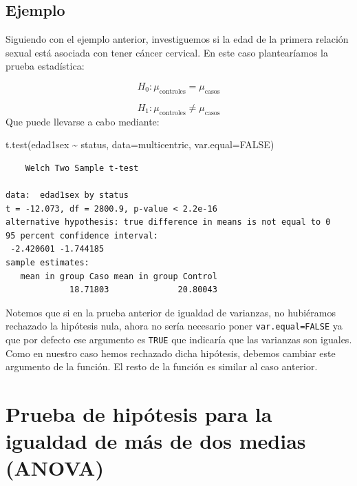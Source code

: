\documentclass[
]{book}
\newenvironment{Shaded}{\begin{snugshade}}{\end{snugshade}}
\newcommand{\AttributeTok}[1]{\textcolor[rgb]{0.77,0.63,0.00}{#1}}
\newcommand{\ConstantTok}[1]{\textcolor[rgb]{0.00,0.00,0.00}{#1}}
\newcommand{\FunctionTok}[1]{\textcolor[rgb]{0.00,0.00,0.00}{#1}}
\newcommand{\NormalTok}[1]{#1}
\newcommand{\SpecialCharTok}[1]{\textcolor[rgb]{0.00,0.00,0.00}{#1}}
\begin{document}
\hypertarget{ejemplo-3}{%
\subsection*{Ejemplo}\label{ejemplo-3}}

Siguiendo con el ejemplo anterior, investiguemos si la edad de la primera relación sexual está asociada con tener cáncer cervical. En este caso plantearíamos la prueba estadística:

\[H_0: \mu_\text{controles} =  \mu_\text{casos}\]

\[H_1: \mu_\text{controles} \neq \mu_\text{casos}\]
Que puede llevarse a cabo mediante:

\begin{Shaded}
\begin{Highlighting}[]
\FunctionTok{t.test}\NormalTok{(edad1sex }\SpecialCharTok{\textasciitilde{}}\NormalTok{ status, }\AttributeTok{data=}\NormalTok{multicentric,}
       \AttributeTok{var.equal=}\ConstantTok{FALSE}\NormalTok{)}
\end{Highlighting}
\end{Shaded}

\begin{verbatim}
    Welch Two Sample t-test

data:  edad1sex by status
t = -12.073, df = 2800.9, p-value < 2.2e-16
alternative hypothesis: true difference in means is not equal to 0
95 percent confidence interval:
 -2.420601 -1.744185
sample estimates:
   mean in group Caso mean in group Control 
             18.71803              20.80043 
\end{verbatim}

Notemos que si en la prueba anterior de igualdad de varianzas, no hubiéramos rechazado la hipótesis nula, ahora no sería necesario poner \texttt{var.equal=FALSE} ya que por defecto ese argumento es \texttt{TRUE} que indicaría que las varianzas son iguales. Como en nuestro caso hemos rechazado dicha hipótesis, debemos cambiar este argumento de la función. El resto de la función es similar al caso anterior.

\hypertarget{prueba-de-hipuxf3tesis-para-la-igualdad-de-muxe1s-de-dos-medias-anova}{%
\section{Prueba de hipótesis para la igualdad de más de dos medias (ANOVA)}\label{prueba-de-hipuxf3tesis-para-la-igualdad-de-muxe1s-de-dos-medias-anova}}
\end{document}
